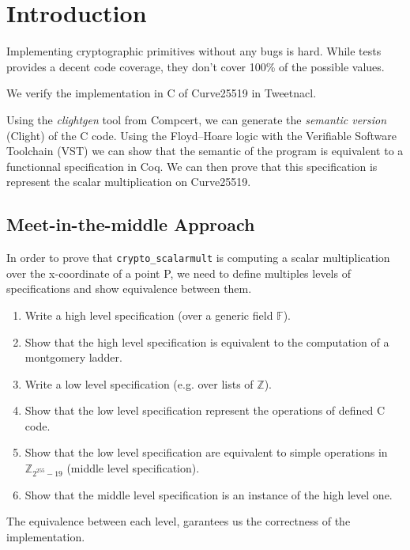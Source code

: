 \section{Introduction}

Implementing cryptographic primitives without any bugs is hard. While tests
provides a decent code coverage, they don't cover 100\% of the possible values.

We verify the implementation in C of Curve25519 in Tweetnacl\cite{BGJ+15}.




Using the \textit{clightgen} tool from Compcert\cite{Leroy-backend}, we can
generate the \textit{semantic version} (Clight\cite{Blazy-Leroy-Clight-09}) of
the C code. Using the Floyd–Hoare logic\cite{1969-Hoare} with the Verifiable
Software Toolchain (VST)\cite{2012-Appel} we can show that the semantic of the
program is equivalent to a functionnal specification in Coq.
We can then prove that this specification is represent the scalar multiplication
on Curve25519\cite{}.

\subsection{Meet-in-the-middle Approach}

In order to prove that \texttt{crypto\_scalarmult} is computing a scalar
multiplication over the x-coordinate of a point P, we need to define multiples
levels of specifications and show equivalence between them.

\begin{enumerate}
  \item Write a high level specification (over a generic field $\mathbb{F}$).
  \item Show that the high level specification is equivalent to the
  computation of a montgomery ladder.
  \item Write a low level specification (e.g. over lists of $\mathbb{Z}$).
  \item Show that the low level specification represent the operations of
  defined C code.
  \item Show that the low level specification are equivalent to simple
  operations in $\mathbb{Z}_{2^{255}-19}$ (middle level specification).
  \item Show that the middle level specification is an instance of the high
  level one.
\end{enumerate}

The equivalence between each level, garantees us the correctness of the
implementation.
